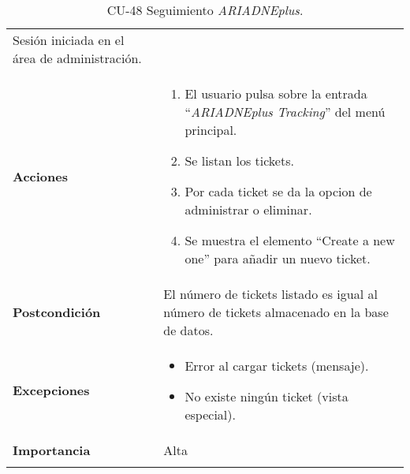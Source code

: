 \begin{longtable}[]{@{}ll@{}}
\begin{minipage}[t]{0.74\columnwidth}
Sesión iniciada en el área de administración.\strut
\end{minipage}\tabularnewline
\begin{minipage}[t]{0.20\columnwidth}\raggedright
\textbf{Acciones}\strut
\end{minipage} & \begin{minipage}[t]{0.74\columnwidth}\raggedright
\begin{enumerate}
\def\labelenumi{\arabic{enumi}.}
\tightlist
\item
  El usuario pulsa sobre la entrada ``\emph{ARIADNEplus Tracking}'' del menú
  principal.
\item
  Se listan los tickets.
\item
  Por cada ticket se da la opcion de administrar o eliminar.
\item
  Se muestra el elemento ``Create a new one'' para añadir un nuevo ticket.
\end{enumerate}\strut
\end{minipage}\tabularnewline
\begin{minipage}[t]{0.20\columnwidth}\raggedright
\textbf{Postcondición}\strut
\end{minipage} & \begin{minipage}[t]{0.74\columnwidth}\raggedright
El número de tickets listado es igual al número de tickets almacenado en
la base de datos.\strut
\end{minipage}\tabularnewline
\begin{minipage}[t]{0.20\columnwidth}\raggedright
\textbf{Excepciones}\strut
\end{minipage} & \begin{minipage}[t]{0.74\columnwidth}\raggedright
\begin{itemize}
\tightlist
\item
  Error al cargar tickets (mensaje).
\item
  No existe ningún ticket (vista especial).
\end{itemize}\strut
\end{minipage}\tabularnewline
\begin{minipage}[t]{0.20\columnwidth}\raggedright
\textbf{Importancia}\strut
\end{minipage} & \begin{minipage}[t]{0.74\columnwidth}\raggedright
Alta\strut
\end{minipage}\tabularnewline
\bottomrule
\caption{CU-48 Seguimiento \emph{ARIADNEplus}.}
\end{longtable}

